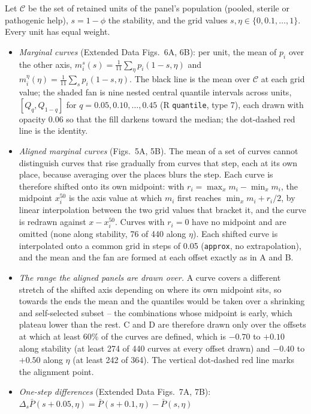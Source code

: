 \documentclass[11pt]{article}
\begin{document}
Let $\mathcal C$ be the set of retained units of the panel's population
(pooled, sterile or pathogenic help), $s = 1 - \phi$ the stability, and the grid
values $s, \eta \in \{0, 0.1, \dots, 1\}$. Every unit has equal weight.
\begin{itemize}
\item \emph{Marginal curves} (Extended Data Figs.~6A, 6B): per unit, the mean of $p_i$
  over the other axis, $m^s_i(s) = \frac{1}{11}\sum_\eta p_i(1-s, \eta)$ and
  $m^\eta_i(\eta) = \frac{1}{11}\sum_s p_i(1-s,\eta)$. The black line is the mean
  over $\mathcal C$ at each grid value; the shaded fan is nine nested central
  quantile intervals across units, $[Q_q, Q_{1-q}]$ for
  $q = 0.05, 0.10, \dots, 0.45$ (R \texttt{quantile}, type 7), each drawn with
  opacity 0.06 so that the fill darkens toward the median; the dot-dashed red
  line is the identity.
\item \emph{Aligned marginal curves} (Figs.~5A, 5B). The mean of a set of
  curves cannot distinguish curves that rise gradually from curves that step,
  each at its own place, because averaging over the places blurs the step. Each
  curve is therefore shifted onto its own midpoint: with
  $r_i = \max_x m_i - \min_x m_i$, the midpoint $x^{50}_i$ is the axis value at
  which $m_i$ first reaches $\min_x m_i + r_i/2$, by linear interpolation
  between the two grid values that bracket it, and the curve is redrawn against
  $x - x^{50}_i$. Curves with $r_i = 0$ have no midpoint and are omitted (none along stability,
  76 of 440 along $\eta$). Each shifted curve is interpolated onto
  a common grid in steps of 0.05 (\texttt{approx}, no extrapolation), and the
  mean and the fan are formed at each offset exactly as in A and B.
\item \emph{The range the aligned panels are drawn over.} A curve covers a
  different stretch of the shifted axis depending on where its own midpoint
  sits, so towards the ends the mean and the quantiles would be taken over a
  shrinking and self-selected subset -- the combinations whose midpoint is
  early, which plateau lower than the rest. C and D are therefore drawn only
  over the offsets at which at least 60\% of the curves are defined, which is
  $-0.70$ to $+0.10$ along stability (at least 274 of 440 curves at every offset
  drawn) and $-0.40$ to $+0.50$ along $\eta$ (at least 242 of 364). The vertical
  dot-dashed red line marks the alignment point.
\item \emph{One-step differences} (Extended Data Figs.~7A, 7B):
  $\Delta_s \bar P(s + 0.05, \eta) = \bar P(s + 0.1, \eta) - \bar P(s, \eta)$

\end{itemize}
\end{document}
